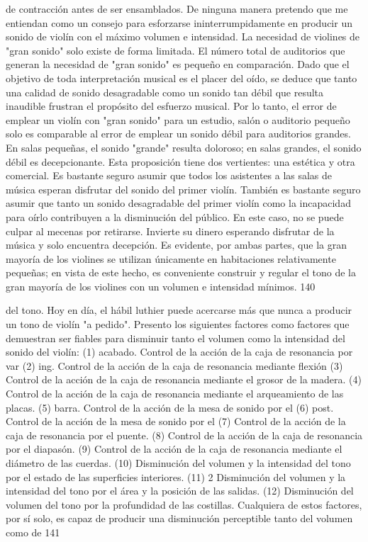 de contracción antes de ser ensamblados.
De ninguna manera pretendo que me entiendan como un consejo para esforzarse ininterrumpidamente en producir un sonido de violín con el máximo volumen e intensidad. La necesidad de violines de "gran sonido" solo existe de forma limitada. El número total de auditorios que generan la necesidad de "gran sonido" es pequeño en comparación. Dado que el objetivo de toda interpretación musical es el placer del oído, se deduce que tanto una calidad de sonido desagradable como un sonido tan débil que resulta inaudible frustran el propósito del esfuerzo musical. Por lo tanto, el error de emplear un violín con "gran sonido" para un estudio, salón o auditorio pequeño solo es comparable al error de emplear un sonido débil para auditorios grandes. En salas pequeñas, el sonido "grande" resulta doloroso; en salas grandes, el sonido débil es decepcionante. Esta proposición tiene dos vertientes: una estética y otra comercial. Es bastante seguro asumir que todos los asistentes a las salas de música esperan disfrutar del sonido del primer violín. También es bastante seguro asumir que tanto un sonido desagradable del primer violín como la incapacidad para oírlo contribuyen a la disminución del público. En este caso, no se puede culpar al mecenas por retirarse. Invierte su dinero esperando disfrutar de la música y solo encuentra decepción.
Es evidente, por ambas partes, que la gran mayoría de los violines se utilizan únicamente en habitaciones relativamente pequeñas; en vista de este hecho, es conveniente construir y regular el tono de la gran mayoría de los violines con un volumen e intensidad mínimos.
140

del tono. Hoy en día, el hábil luthier puede acercarse más que nunca a producir un tono de violín "a pedido".
Presento los siguientes factores como factores que demuestran ser fiables para disminuir tanto el volumen como la intensidad del sonido del violín:
(1) acabado.	Control de la acción de la caja de resonancia por var
(2) ing.	Control de la acción de la caja de resonancia mediante flexión
(3) Control de la acción de la caja de resonancia mediante el grosor de la madera.
(4) Control de la acción de la caja de resonancia mediante el arqueamiento de las placas.
(5) barra.	Control de la acción de la mesa de sonido por el
(6) post.	Control de la acción de la mesa de sonido por el
(7) Control de la acción de la caja de resonancia por el puente.
(8) Control de la acción de la caja de resonancia por el diapasón.
(9) Control de la acción de la caja de resonancia mediante el diámetro de las cuerdas.
(10) Disminución del volumen y la intensidad del tono por el estado de las superficies interiores.
(11) 2 Disminución del volumen y la intensidad del tono por el área y la posición de las salidas.
(12)  Disminución del volumen del tono por la profundidad de las costillas.
Cualquiera de estos factores, por sí solo, es capaz de producir una disminución perceptible tanto del volumen como de
141

